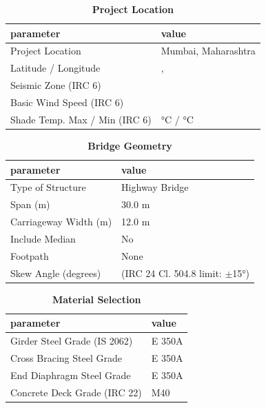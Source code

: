 \documentclass[12pt,a4paper]{report}
\numberwithin{table}{chapter}
\numberwithin{figure}{chapter}
\begin{document}
\begin{table}[H]
\caption{\textbf{Project Location}}
\label{subsec:project-location}
\begin{tabular}{|L{5.5cm}|L{8.5cm}|}
\hline
\textbf{parameter} & \textbf{value} \\
\hline
\textnormal{Project Location} & Mumbai, Maharashtra \\
\hline
\textnormal{Latitude / Longitude} & ,  \\
\hline
\textnormal{Seismic Zone (IRC 6)} &  \\
\hline
\textnormal{Basic Wind Speed (IRC 6)} &  \\
\hline
\textnormal{Shade Temp. Max / Min (IRC 6)} &  °C /  °C \\
\hline
\end{tabular}
\vspace{0.4cm}
\end{table}

\begin{table}[H]
\caption{\textbf{Bridge Geometry}}
\label{subsec:bridge-geometry}
\begin{tabular}{|L{5.5cm}|L{8.5cm}|}
\hline
\textbf{parameter} & \textbf{value} \\
\hline
\textnormal{Type of Structure} & Highway Bridge \\
\hline
\textnormal{Span (m)} & 30.0 m \\
\hline
\textnormal{Carriageway Width (m)} & 12.0 m \\
\hline
\textnormal{Include Median} & No \\
\hline
\textnormal{Footpath} & None \\
\hline
\textnormal{Skew Angle (degrees)} &  (IRC 24 Cl. 504.8 limit: $\pm$15°) \\
\hline
\end{tabular}
\end{table}
\vspace{0.4cm}

\begin{table}[H]
\caption{\textbf{Material Selection}}
\label{subsec:material}
\begin{tabular}{|L{5.5cm}|L{8.5cm}|}
\hline
\textbf{parameter} & \textbf{value} \\
\hline
\textnormal{Girder Steel Grade (IS 2062)} & E 350A \\
\hline
\textnormal{Cross Bracing Steel Grade} & E 350A \\
\hline
\textnormal{End Diaphragm Steel Grade} & E 350A \\
\hline
\textnormal{Concrete Deck Grade (IRC 22)} & M40 \\
\hline
\end{tabular}
\end{table}
\vspace{0.4cm}
\end{document}
